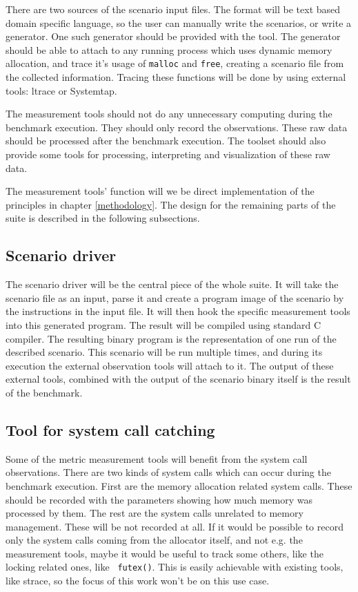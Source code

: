 There are two sources of the scenario input files. The format will be text based
domain specific language, so the user can manually write the scenarios, or write
a generator. One such generator should be provided with the tool. The generator
should be able to attach to any running process which uses dynamic memory
allocation, and trace it's usage of {\tt malloc} and {\tt free}, creating a
scenario file from the collected information. Tracing these functions will be
done by using external tools: ltrace or Systemtap.

The measurement tools should not do any unnecessary computing during the
benchmark execution. They should only record the observations. These raw data
should be processed after the benchmark execution. The toolset should also
provide some tools for processing, interpreting and visualization of these raw
data.

The measurement tools' function will we be direct implementation of the
principles in chapter \ref{methodology}. The design for the remaining parts of
the suite is described in the following subsections.

\subsection{Scenario driver}

The scenario driver will be the central piece of the whole suite. It will take
the scenario file as an input, parse it and create a program image of the
scenario by the instructions in the input file. It will then hook the specific
measurement tools into this generated program. The result will be compiled using
standard C compiler. The resulting binary program is the representation of one
run of the described scenario. This scenario will be run multiple times, and
during its execution the external observation tools will attach to it. The output
of these external tools, combined with the output of the scenario binary itself
is the result of the benchmark.

\subsection{Tool for system call catching}

Some of the metric measurement tools will benefit from the system call
observations. There are two kinds of system calls which can occur during the
benchmark execution. First are the memory allocation related system calls. These
should be recorded with the parameters showing how much memory was processed by
them. The rest are the system calls unrelated to memory management. These will be
not recorded at all. If it would be possible to record only the system calls
coming from the allocator itself, and not e.g. the measurement tools, maybe it
would be useful to track some others, like the locking related ones, like {\tt
futex()}. This is easily achievable with existing tools, like strace, so the
focus of this work won't be on this use case.

